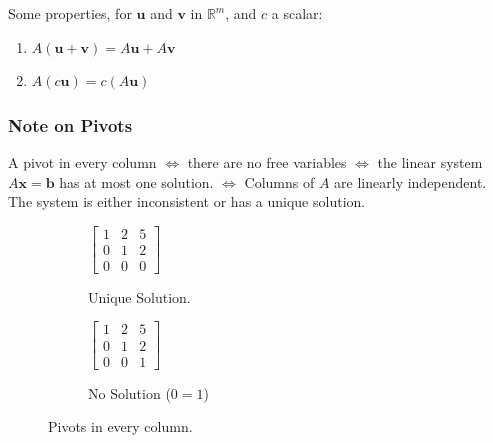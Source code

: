 \documentclass[../linear-algebra.tex]{subfiles}
\begin{document}
\noindent Some properties, for $\mathbf{u}$ and $\mathbf{v}$ in $\mathbb{R}^m$, and $c$ a scalar:
\begin{enumerate}
    \item $A(\mathbf{u} + \mathbf{v}) = A\mathbf{u} + A\mathbf{v}$
    \item $A(c\mathbf{u}) = c(A\mathbf{u})$
\end{enumerate}

\subsubsection{Note on Pivots}
A pivot in every column $\iff$ there are no free variables $\iff$ the linear system $A\mathbf{x}=\mathbf{b}$
has at most one solution. $\iff$ Columns of $A$ are linearly independent. The system is either inconsistent or has a unique solution.

\begin{figure}[h!]
     \centering
     \begin{subfigure}[b]{0.45\textwidth}
         \centering
         $\left[
         \begin{array}{cc|c}
         \boxed{1} & 2 & 5 \\
         0 & \boxed{1} & 2 \\
         0 & 0 & 0
         \end{array}
         \right]$
         \caption{Unique Solution.}
         \label{fig:unique}
     \end{subfigure}
     \hfill
     \begin{subfigure}[b]{0.45\textwidth}
         \centering
         $\left[
         \begin{array}{cc|c}
         \boxed{1} & 2 & 5 \\
         0 & \boxed{1} & 2 \\
         0 & 0 & 1
         \end{array}
         \right]$
         \caption{No Solution ($0=1$)}
         \label{fig:no_sol}
     \end{subfigure}
     
     \caption*{Pivots in every column.}
     \label{fig:matrix_comparison}
\end{figure}
\end{document}
